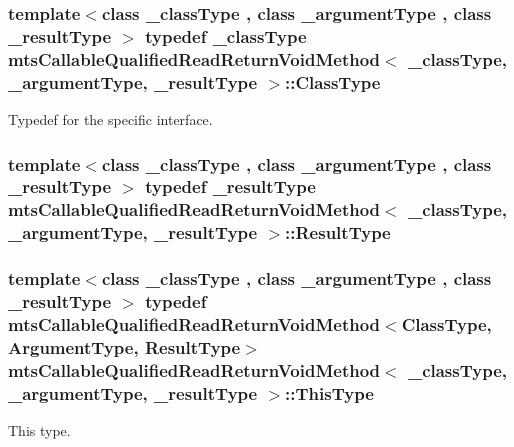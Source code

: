 \hypertarget{classmts_callable_qualified_read_return_void_method_ae99cfab8208eb374f2cdf01c97edfa3b}{
\subsubsection[{Class\-Type}]{\setlength{\rightskip}{0pt plus 5cm}template$<$class \-\_\-class\-Type , class \-\_\-argument\-Type , class \-\_\-result\-Type $>$ typedef \-\_\-class\-Type {\bf mts\-Callable\-Qualified\-Read\-Return\-Void\-Method}$<$ \-\_\-class\-Type, \-\_\-argument\-Type, \-\_\-result\-Type $>$\-::{\bf Class\-Type}}}\label{classmts_callable_qualified_read_return_void_method_ae99cfab8208eb374f2cdf01c97edfa3b}
Typedef for the specific interface. \hypertarget{classmts_callable_qualified_read_return_void_method_a533ffd51ea529b0a585985eaf06ab08f}{
\subsubsection[{Result\-Type}]{\setlength{\rightskip}{0pt plus 5cm}template$<$class \-\_\-class\-Type , class \-\_\-argument\-Type , class \-\_\-result\-Type $>$ typedef \-\_\-result\-Type {\bf mts\-Callable\-Qualified\-Read\-Return\-Void\-Method}$<$ \-\_\-class\-Type, \-\_\-argument\-Type, \-\_\-result\-Type $>$\-::{\bf Result\-Type}}}\label{classmts_callable_qualified_read_return_void_method_a533ffd51ea529b0a585985eaf06ab08f}
\hypertarget{classmts_callable_qualified_read_return_void_method_a916abe9c683c314f85c9b67c960a67f9}{
\subsubsection[{This\-Type}]{\setlength{\rightskip}{0pt plus 5cm}template$<$class \-\_\-class\-Type , class \-\_\-argument\-Type , class \-\_\-result\-Type $>$ typedef {\bf mts\-Callable\-Qualified\-Read\-Return\-Void\-Method}$<${\bf Class\-Type}, {\bf Argument\-Type}, {\bf Result\-Type}$>$ {\bf mts\-Callable\-Qualified\-Read\-Return\-Void\-Method}$<$ \-\_\-class\-Type, \-\_\-argument\-Type, \-\_\-result\-Type $>$\-::{\bf This\-Type}}}\label{classmts_callable_qualified_read_return_void_method_a916abe9c683c314f85c9b67c960a67f9}
This type. 

